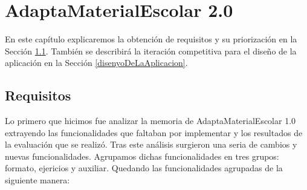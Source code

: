 \chapter{AdaptaMaterialEscolar 2.0}
\label{cap:AdaptaMaterialEscolar2.0}
En este capítulo explicaremos la obtención de requisitos y su priorización en la Sección \ref{cap:requisitos}. También se describirá la iteración competitiva para el diseño de la aplicación en la Sección \ref{disenyoDeLaAplicacion}.

\section{Requisitos}
\label{cap:requisitos}

Lo primero que hicimos fue analizar la memoria de AdaptaMaterialEscolar 1.0 extrayendo las funcionalidades que faltaban por implementar y los resultados de la evaluación que se realizó. Tras este análisis surgieron una seria de cambios y nuevas funcionalidades. Agrupamos dichas funcionalidades en tres grupos: formato, ejericios y auxiliar. Quedando las funcionalidades agrupadas de la siguiente manera:
\\


